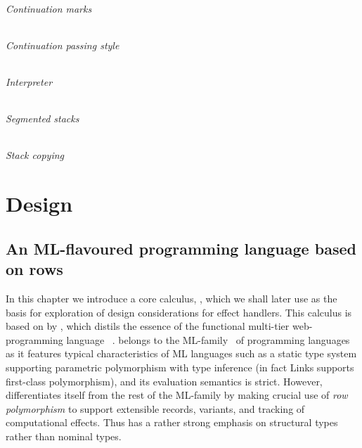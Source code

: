 \documentclass[12pt,phd,lfcs,twoside,openright,logo,leftchapter,normalheadings]{infthesis}
\theoremstyle{plain}
\theoremstyle{definition}
\begin{document}
\paragraph{Continuation marks}

\paragraph{Continuation passing style}

\paragraph{Interpreter}

\paragraph{Segmented stacks}

\paragraph{Stack copying}

\part{Design}

\chapter{An ML-flavoured programming language based on rows}
\label{ch:base-language}

In this chapter we introduce a core calculus, \BCalc{}, which we shall
later use as the basis for exploration of design considerations for
effect handlers. This calculus is based on \CoreLinks{} by
\citet{LindleyC12}, which distils the essence of the functional
multi-tier web-programming language
\Links{}~\cite{CooperLWY06}. \Links{} belongs to the
ML-family~\cite{MilnerTHM97} of programming languages as it features
typical characteristics of ML languages such as a static type system
supporting parametric polymorphism with type inference (in fact Links
supports first-class polymorphism), and its evaluation semantics is
strict. However, \Links{} differentiates itself from the rest of the
ML-family by making crucial use of \emph{row polymorphism} to support
extensible records, variants, and tracking of computational
effects. Thus \Links{} has a rather strong emphasis on structural
types rather than nominal types.
\end{document}
